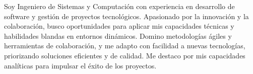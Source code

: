 Soy Ingeniero de Sistemas y Computación con experiencia en desarrollo de software y gestión de proyectos tecnológicos. Apasionado por la innovación y la colaboración, busco oportunidades para aplicar mis capacidades técnicas y habilidades blandas en entornos dinámicos. Domino metodologías ágiles y herramientas de colaboración, y me adapto con facilidad a nuevas tecnologías, priorizando soluciones eficientes y de calidad. Me destaco por mis capacidades analíticas para impulsar el éxito de los proyectos.
